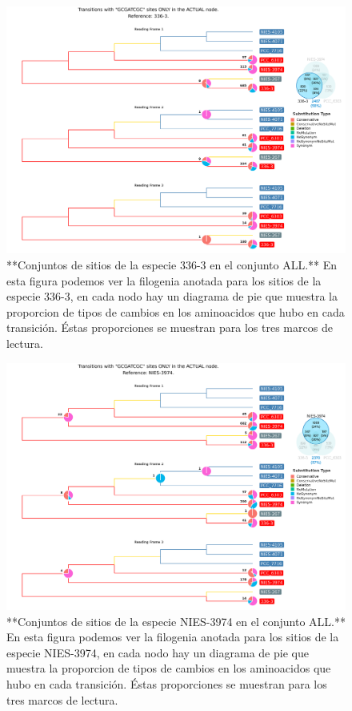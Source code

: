 \documentclass[
]{book}
\begin{document}
\begin{figure}

{\centering \includegraphics[width=1.2\linewidth]{Clados/Calothrix_B/figures/A/GCGATCGC/Actual/336-3_Actual_A_tree} 

}

\caption{**Conjuntos de sitios de la especie 336-3 en el conjunto ALL.** En esta figura podemos ver la filogenia anotada para los sitios de la especie 336-3, en cada nodo hay un diagrama de pie que muestra la proporcion de tipos de cambios en los aminoacidos que hubo en cada transición. Éstas proporciones se muestran para los tres marcos de lectura.}\label{fig:FIG13x}
\end{figure}

\begin{figure}

{\centering \includegraphics[width=1.2\linewidth]{Clados/Calothrix_B/figures/A/GCGATCGC/Actual/NIES-3974_Actual_A_tree} 

}

\caption{**Conjuntos de sitios de la especie NIES-3974 en el conjunto ALL.** En esta figura podemos ver la filogenia anotada para los sitios de la especie NIES-3974, en cada nodo hay un diagrama de pie que muestra la proporcion de tipos de cambios en los aminoacidos que hubo en cada transición. Éstas proporciones se muestran para los tres marcos de lectura.}\label{fig:FIG14x}
\end{figure}
\end{document}
